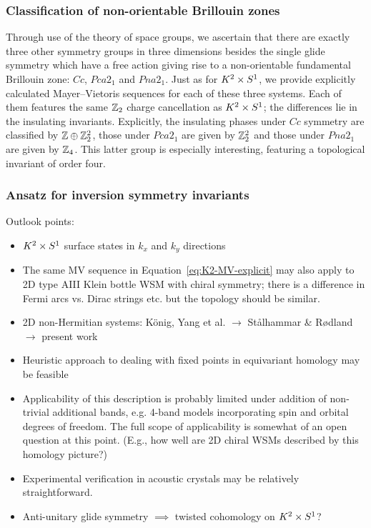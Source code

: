 \subsubsection{Classification of non-orientable Brillouin zones}

Through use of the theory of space groups, we ascertain that there are exactly three other symmetry groups in three dimensions besides the single glide symmetry which have a free action giving rise to a non-orientable fundamental Brillouin zone: $Cc$, $Pca2_1$ and $Pna2_1$. Just as for $K^2\times S^1$, we provide explicitly calculated Mayer--Vietoris sequences for each of these three systems. Each of them features the same $\mathbb{Z}_2$ charge cancellation as $K^2\times S^1$; the differences lie in the insulating invariants. Explicitly, the insulating phases under $Cc$ symmetry are classified by $\mathbb{Z}\oplus\mathbb{Z}_2^2$, those under $Pca2_1$ are given by $\mathbb{Z}_2^2$ and those under $Pna2_1$ are given by $\mathbb{Z}_4$. This latter group is especially interesting, featuring a topological invariant of order four.

{\color{blue}\subsubsection{Ansatz for inversion symmetry invariants}}



\label{sec:outlook}


{\color{blue}
Outlook points:	

\begin{itemize}	
	\item $K^2\times S^1$ surface states in $k_x$ and $k_y$ directions
	
	\item The same MV sequence in Equation~\eqref{eq:K2-MV-explicit} may also apply to 2D type AIII Klein bottle WSM with chiral symmetry; there is a difference in Fermi arcs vs. Dirac strings etc. but the topology should be similar.
	
	\item 2D non-Hermitian systems: König, Yang et al. $\to$ Stålhammar \& Rødland $\to$ present work
	
	\item Heuristic approach to dealing with fixed points in equivariant homology may be feasible
	
	\item Applicability of this description is probably limited under addition of non-trivial additional bands, e.g. 4-band models incorporating spin and orbital degrees of freedom. The full scope of applicability is somewhat of an open question at this point. (E.g., how well are 2D chiral WSMs described by this homology picture?)
	
	\item Experimental verification in acoustic crystals may be relatively straightforward.
	
	\item Anti-unitary glide symmetry $\implies$ twisted cohomology on $K^2\times S^1$? %
\end{itemize}
}

